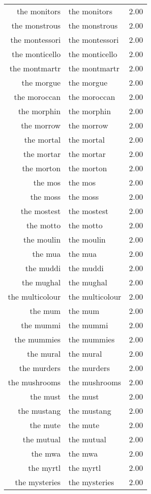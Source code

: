 \begin{table}[ht]
\begin{tabular}{rlr}
  the monitors & the monitors & 2.00 \\ 
  the monstrous & the monstrous & 2.00 \\ 
  the montessori & the montessori & 2.00 \\ 
  the monticello & the monticello & 2.00 \\ 
  the montmartr & the montmartr & 2.00 \\ 
  the morgue & the morgue & 2.00 \\ 
  the moroccan & the moroccan & 2.00 \\ 
  the morphin & the morphin & 2.00 \\ 
  the morrow & the morrow & 2.00 \\ 
  the mortal & the mortal & 2.00 \\ 
  the mortar & the mortar & 2.00 \\ 
  the morton & the morton & 2.00 \\ 
  the mos & the mos & 2.00 \\ 
  the moss & the moss & 2.00 \\ 
  the mostest & the mostest & 2.00 \\ 
  the motto & the motto & 2.00 \\ 
  the moulin & the moulin & 2.00 \\ 
  the mua & the mua & 2.00 \\ 
  the muddi & the muddi & 2.00 \\ 
  the mughal & the mughal & 2.00 \\ 
  the multicolour & the multicolour & 2.00 \\ 
  the mum & the mum & 2.00 \\ 
  the mummi & the mummi & 2.00 \\ 
  the mummies & the mummies & 2.00 \\ 
  the mural & the mural & 2.00 \\ 
  the murders & the murders & 2.00 \\ 
  the mushrooms & the mushrooms & 2.00 \\ 
  the must & the must & 2.00 \\ 
  the mustang & the mustang & 2.00 \\ 
  the mute & the mute & 2.00 \\ 
  the mutual & the mutual & 2.00 \\ 
  the mwa & the mwa & 2.00 \\ 
  the myrtl & the myrtl & 2.00 \\ 
  the mysteries & the mysteries & 2.00 \\ 

\end{tabular}
\end{table}

